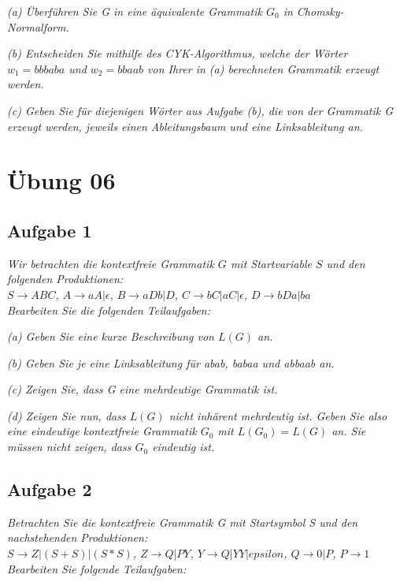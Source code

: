 \documentclass[a4paper]{article}
\begin{document}
\textit{(a) Überführen Sie G in eine äquivalente Grammatik $G_0$ in Chomsky-Normalform.}

\textit{(b) Entscheiden Sie mithilfe des CYK-Algorithmus, welche der Wörter $w_1 = bbbaba$ und $w_2 = bbaab$ von Ihrer in (a) berechneten Grammatik erzeugt werden.}

\textit{(c) Geben Sie für diejenigen Wörter aus Aufgabe (b), die von der Grammatik G erzeugt werden, jeweils einen Ableitungsbaum und eine Linksableitung an.}



\newpage
\section{Übung 06}
\subsection{Aufgabe 1}
\textit{Wir betrachten die kontextfreie Grammatik $G$ mit Startvariable $S$ und den folgenden Produktionen:\\
    $S\rightarrow ABC$, $A\rightarrow aA |\epsilon$, $B\rightarrow aDb | D$, $C \rightarrow bC | aC | \epsilon$, $D \rightarrow bDa | ba$\\
    Bearbeiten Sie die folgenden Teilaufgaben:}

\textit{(a) Geben Sie eine kurze Beschreibung von $L(G)$ an.}

\textit{(b) Geben Sie je eine Linksableitung für abab, babaa und abbaab an.}

\textit{(c) Zeigen Sie, dass G eine mehrdeutige Grammatik ist.}

\textit{(d) Zeigen Sie nun, dass $L(G)$ nicht inhärent mehrdeutig ist. Geben Sie also eine eindeutige kontextfreie Grammatik $G_0$ mit $L(G_0) = L(G)$ an. Sie müssen nicht zeigen, dass $G_0$ eindeutig ist.}

\subsection{Aufgabe 2}
\textit{Betrachten Sie die kontextfreie Grammatik G mit Startsymbol S und den nachstehenden Produktionen:\\
    $S\rightarrow Z | (S + S) | (S * S)$, $Z\rightarrow Q | PY$, $Y\rightarrow Q | YY | epsilon$,
    $Q\rightarrow 0 | P$, $P\rightarrow 1$\\
    Bearbeiten Sie folgende Teilaufgaben:}
\end{document}

